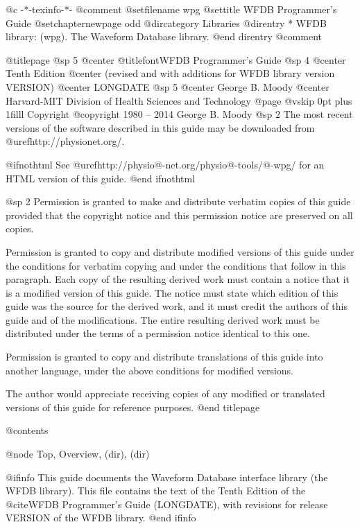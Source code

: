 	@c -*-texinfo-*-
@comment %
@setfilename wpg
@settitle WFDB Programmer's Guide
@setchapternewpage odd
@dircategory Libraries
@direntry
* WFDB library: (wpg).		The Waveform Database library.
@end direntry
@comment %

@titlepage
@sp 5
@center @titlefont{WFDB Programmer's Guide}
@sp 4
@center Tenth Edition
@center (revised and with additions for WFDB library version VERSION)
@center LONGDATE
@sp 5
@center George B. Moody
@center Harvard-MIT Division of Health Sciences and Technology
@page
@vskip 0pt plus 1filll
Copyright @copyright{} 1980 -- 2014 George B. Moody
@sp 2
The most recent versions of the software described in this guide may be
downloaded from @uref{http://physionet.org/}.

@ifnothtml
See @uref{http://physio@-net.org/physio@-tools/@-wpg/}
for an HTML version of this guide.
@end ifnothtml

@sp 2
Permission is granted to make and distribute verbatim copies of this
guide provided that the copyright notice and this permission notice are
preserved on all copies.

Permission is granted to copy and distribute modified versions of this
guide under the conditions for verbatim copying and under the conditions
that follow in this paragraph.  Each copy of the resulting derived work
must contain a notice that it is a modified version of this guide.  The
notice must state which edition of this guide was the source for the derived
work, and it must credit the authors of this guide and of the
modifications.  The entire resulting derived work must be distributed
under the terms of a permission notice identical to this one.

Permission is granted to copy and distribute translations of this guide
into another language, under the above conditions for modified versions.

The author would appreciate receiving copies of any modified or
translated versions of this guide for reference purposes.
@end titlepage

@contents

@node Top, Overview, (dir), (dir)

@ifinfo
This guide documents the Waveform Database interface library (the WFDB
library).  This file contains the text of the Tenth Edition of
the @cite{WFDB Programmer's Guide} (LONGDATE), with
revisions for release VERSION of the WFDB library.
@end ifinfo

